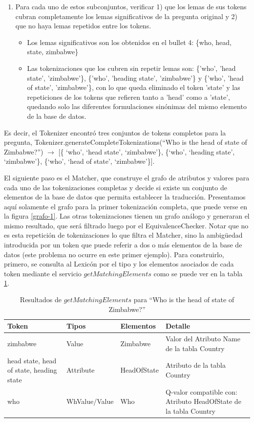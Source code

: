 \begin{enumerate}
  \item Para cada uno de estos subconjuntos, verificar 1) que los lemas de sus tokens cubran completamente
los lemas significativos de la pregunta original y 2) que no haya lemas repetidos
entre los tokens.
  \begin{itemize}
    \item Los lemas significativos son los obtenidos en el bullet 4: \{who, head, state, zimbabwe\}
    \item Las tokenizaciones que los cubren sin repetir lemas son: \{'who', 'head state', 'zimbabwe'\},
    \{'who', 'heading state', 'zimbabwe'\} y  \{'who', 'head of state', 'zimbabwe'\}, con lo que queda eliminado el token 'state' y las repeticiones de los tokens que refieren tanto a 'head' como a 'state', quedando solo las diferentes formulaciones sinónimas del mismo elemento de la base de datos.
  \end{itemize}
\end{enumerate}

Es decir, el Tokenizer encontró tres conjuntos de tokens completos para la pregunta, Tokenizer.generateCompleteTokenizations(``Who is the head of state of Zimbabwe?'') $\rightarrow$ [\{ `who', `head state', `zimbabwe'\}, \{`who', `heading state', `zimbabwe'\}, \{`who', `head of state', `zimbabwe'\}].

El siguiente paso es el Matcher, que construye el grafo de atributos y valores para cada uno de las tokenizaciones completas y decide si existe un conjunto de elementos de la base de datos que permita establecer la traducción. Presentamos aquí solamente el grafo para la primer tokenización completa, que puede verse en la figura \ref{grafo-1}. Las otras tokenizaciones tienen un grafo análogo y generaran el mismo resultado, que será filtrado luego por el EquivalenceChecker. Notar que no es esta repetición de tokenizaciones lo que filtra el Matcher, sino la ambigüedad introducida por un token que puede referir a dos o más elementos de la base de datos (este problema no ocurre en este primer ejemplo).
 Para construirlo, primero, se consulta al Lexicón por el tipo y los elementos asociados de cada token mediante el servicio $getMatchingElements$ como se puede ver en la tabla \ref{table:get-matching-elements-1}.
\begin{center}
\begin{table}[h]
\centering
\begin{tabular}{| p{3cm} | l | l | p{6cm} |}
\hline
Token & Tipos & Elementos & Detalle \\ \hline
zimbabwe & Value & Zimbabwe & Valor del Atributo Name de la tabla Country\\ \hline
head state, head of state, heading state & Attribute & HeadOfState & Atributo de la tabla Country\\ \hline
who & WhValue/Value & Who & Q-valor compatible con: Atributo HeadOfState de la tabla Country\\ \hline
\end{tabular}
\caption{Resultados de $getMatchingElements$ para ``Who is the head of state of Zimbabwe?''}
\label{table:get-matching-elements-1}
\end{table}
\end{center}

